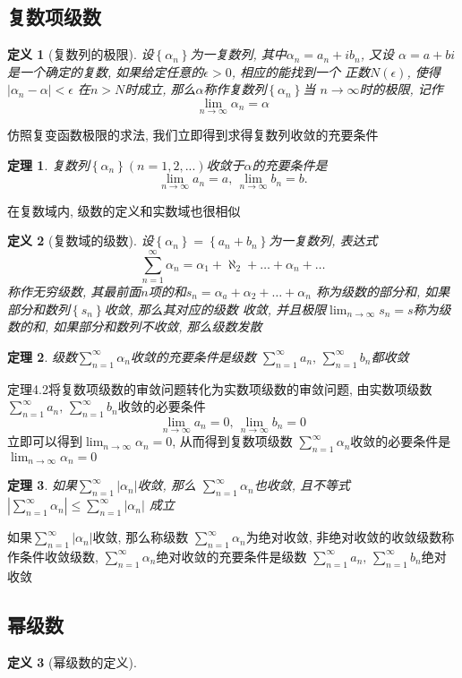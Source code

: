 \documentclass[12pt, a4paper, oneside]{ctexart}
\theoremstyle{plain}
\newtheorem{theorem}{定理}[section]
\newtheorem{definition}{定义}[section]
\theoremstyle{definition}
\theoremstyle{definition}
\begin{document}
\subsection{复数项级数}
\begin{definition}[复数列的极限]
    设$\left\{ \alpha_n \right\}$为一复数列, 其中$\alpha_n=a_n+ib_n$, 又设
    $\alpha=a+bi$是一个确定的复数, 如果给定任意的$\epsilon>0$, 相应的能找到一个
    正数$N(\epsilon)$, 使得$\left\lvert \alpha_n -\alpha \right\rvert < \epsilon$
    在$n>N$时成立, 那么$\alpha$称作复数列$\left\{ \alpha_n \right\}$当
    $n\to\infty $时的极限, 记作
    \[
        \lim_{n\to\infty}\alpha_n=\alpha
    \]
\end{definition}
\noindent 仿照复变函数极限的求法, 我们立即得到求得复数列收敛的充要条件
\begin{theorem}
    复数列$\left\{\alpha_n\right\}(n=1,2,...)$收敛于$\alpha$的充要条件是
    \[
    \lim_{n\to\infty}a_n=a,\,\lim_{n\to\infty}b_n=b.
    \]
\end{theorem}
在复数域内, 级数的定义和实数域也很相似
\begin{definition}[复数域的级数]
    设$\left\{\alpha_n\right\}=\left\{a_n+b_n\right\}$为一复数列, 表达式
    \[
    \sum_{n=1}^{\infty}\alpha_n=\alpha_1+\aleph_2+\dots+\alpha_n+\dots
    \]
    称作无穷级数, 其最前面$n$项的和$s_n=\displaystyle\alpha_a+\alpha_2+\dots+\alpha_n$
    称为级数的部分和, 如果部分和数列$\left\{s_n\right\}$收敛, 那么其对应的级数
    收敛, 并且极限$\displaystyle\lim_{n\to\infty}s_n=s$称为级数的和, 如果部分和数列不收敛,
    那么级数发散
\end{definition}
\begin{theorem}
    级数$\displaystyle\sum_{n=1}^{\infty}\alpha_n$收敛的充要条件是级数
    $\displaystyle\sum_{n=1}^{\infty}a_n,\, \sum_{n=1}^{\infty}b_n$都收敛
\end{theorem}
定理4.2将复数项级数的审敛问题转化为实数项级数的审敛问题, 由实数项级数
$\displaystyle\sum_{n=1}^{\infty}a_n,\, \sum_{n=1}^{\infty}b_n$收敛的必要条件
\[
\displaystyle\lim_{n\to\infty}a_n=0,\,\displaystyle\lim_{n\to\infty}b_n=0
\]
立即可以得到$\displaystyle\lim_{n\to\infty}\alpha_n=0$, 从而得到复数项级数
$\displaystyle\sum_{n=1}^{\infty}\alpha_n$收敛的必要条件是$\displaystyle\lim_{n\to\infty}\alpha_n=0$
\begin{theorem}
    如果$\displaystyle\sum_{n=1}^{\infty}\left\lvert \alpha_n\right\rvert $收敛, 那么
    $\displaystyle\sum_{n=1}^{\infty}\alpha_n$也收敛, 且不等式
    $\displaystyle\left\lvert \sum_{n=1}^{\infty}\alpha_n\right\rvert \leq\displaystyle\sum_{n=1}^{\infty}\left\lvert \alpha_n\right\rvert$
    成立
\end{theorem}
如果$\displaystyle\sum_{n=1}^{\infty}\left\lvert \alpha_n\right\rvert $收敛, 那么称级数
$\displaystyle\sum_{n=1}^{\infty}\alpha_n$为绝对收敛, 非绝对收敛的收敛级数称作条件收敛级数, 
$\displaystyle\sum_{n=1}^{\infty}\alpha_n$绝对收敛的充要条件是级数
$\displaystyle\sum_{n=1}^{\infty}a_n,\, \displaystyle\sum_{n=1}^{\infty}b_n$绝对收敛
\subsection{幂级数}
\begin{definition}[幂级数的定义]
    
\end{definition}
\end{document}

